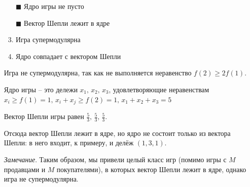 	\begin{enumerate}[label=$\square$]
		\item[$\blacksquare$] Ядро игры не пусто
		\item[$\blacksquare$] Вектор Шепли лежит в ядре
		\item Игра супермодулярна
		\item Ядро совпадает с вектором Шепли
	\end{enumerate}

	\solution
	Игра не супермодулярна, так как не выполняется неравенство $f(2) \geq 2f(1)$.
	
	Ядро игры -- это дележи $x_1,\,x_2,\,x_3$, удовлетворяющие неравенствам $x_i \geq f(1)=1,\, x_i+x_j \geq f(2)=1,\, x_1+x_2+x_3=5$
	
	Вектор Шепли игры равен $\frac{5}{3},\,\frac{5}{3},\,\frac{5}{3}$.
	
	Отсюда вектор Шепли лежит в ядре, но ядро не состоит только из вектора Шепли: в него входит, к примеру, и делёж $(1,3,1)$.
	
	\textit{Замечание}. Таким образом, мы привели целый класс игр (помимо игры с $M$ продавцами и $M$ покупателями), в которых вектор Шепли лежит в ядре, однако игра не супермодулярна.